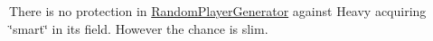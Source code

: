 
\begin{DoxyRefList}
\item[\label{bug__bug000001}%
\hypertarget{bug__bug000001}{}%
page \hyperlink{index}{Team Fortress 2 Player Tracker} ]
\begin{DoxyItemize}
\item There is no protection in \hyperlink{class_random_player_generator}{Random\+Player\+Generator} against Heavy acquiring \char`\"{}smart\char`\"{} in its field. However the chance is slim.
\end{DoxyItemize}
\end{DoxyRefList}